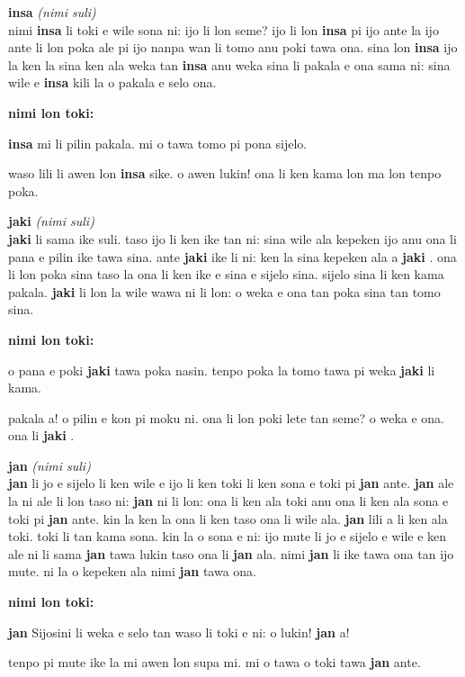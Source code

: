 \documentclass[a4paper,11pt]{book}
\newenvironment{definition}[2]{ %
  \begin{description}
  \item
    {\huge \textbf{#1}}
    {\Large \textit{(#2)}} \\
}{
  \end{description}%
}
\newenvironment{example}{ %
  \item
  \textbf{nimi lon toki:}
  
  \hfill
  \begin{minipage}{\dimexpr\textwidth-1cm}
  \begin{itshape}
}
{
  \end{itshape}
  \end{minipage}
}
\newcommand{\inex}[1]{%
  \textbf{#1}%
}
\begin{document}
\pagebreak

\begin{definition}{insa}{nimi suli}
  nimi \inex{insa} li toki e wile sona ni: ijo li lon seme? ijo li lon \inex{insa} pi ijo ante la ijo ante li lon poka ale pi ijo nanpa wan li tomo anu poki tawa ona. sina lon \inex{insa} ijo la ken la sina ken ala weka tan \inex{insa} anu weka sina li pakala e ona sama ni: sina wile e \inex{insa} kili la o pakala e selo ona.
  \begin{example}
    \inex{insa} mi li pilin pakala. mi o tawa tomo pi pona sijelo.
    
    waso lili li awen lon \inex{insa} sike. o awen lukin! ona li ken kama lon ma lon tenpo poka.
  \end{example}
\end{definition}

\begin{definition}{jaki}{nimi suli}
  \inex{jaki} li sama ike suli. taso ijo li ken ike tan ni: sina wile ala kepeken ijo anu ona li pana e pilin ike tawa sina. ante \inex{jaki} ike li ni: ken la sina kepeken ala a \inex{jaki}. ona li lon poka sina taso la ona li ken ike e sina e sijelo sina. sijelo sina li ken kama pakala. \inex{jaki} li lon la wile wawa ni li lon: o weka e ona tan poka sina tan tomo sina.
  \begin{example}
    o pana e poki \inex{jaki} tawa poka nasin. tenpo poka la tomo tawa pi weka \inex{jaki} li kama.

    pakala a! o pilin e kon pi moku ni. ona li lon poki lete tan seme? o weka e ona. ona li \inex{jaki}.
  \end{example}
\end{definition}

\begin{definition}{jan}{nimi suli}
  \inex{jan} li jo e sijelo li ken wile e ijo li ken toki li ken sona e toki pi \inex{jan} ante. \inex{jan} ale la ni ale li lon taso ni: \inex{jan} ni li lon: ona li ken ala toki anu ona li ken ala sona e toki pi \inex{jan} ante. kin la ken la ona li ken taso ona li wile ala. \inex{jan} lili a li ken ala toki. toki li tan kama sona. kin la o sona e ni: ijo mute li jo e sijelo e wile e ken ale ni li sama \inex{jan} tawa lukin taso ona li \inex{jan} ala. nimi \inex{jan} li ike tawa ona tan ijo mute. ni la o kepeken ala nimi \inex{jan} tawa ona.
  \begin{example}
    \inex{jan} Sijosini li weka e selo tan waso li toki e ni: o lukin! \inex{jan} a!
    
    tenpo pi mute ike la mi awen lon supa mi. mi o tawa o toki tawa \inex{jan} ante.
  \end{example}
\end{definition}
\end{document}
